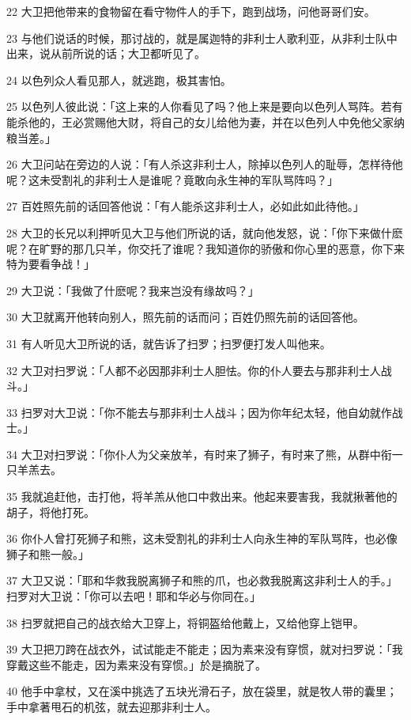 \par 22 大卫把他带来的食物留在看守物件人的手下，跑到战场，问他哥哥们安。
\par 23 与他们说话的时候，那讨战的，就是属迦特的非利士人歌利亚，从非利士队中出来，说从前所说的话；大卫都听见了。
\par 24 以色列众人看见那人，就逃跑，极其害怕。
\par 25 以色列人彼此说：「这上来的人你看见了吗？他上来是要向以色列人骂阵。若有能杀他的，王必赏赐他大财，将自己的女儿给他为妻，并在以色列人中免他父家纳粮当差。」
\par 26 大卫问站在旁边的人说：「有人杀这非利士人，除掉以色列人的耻辱，怎样待他呢？这未受割礼的非利士人是谁呢？竟敢向永生神的军队骂阵吗？」
\par 27 百姓照先前的话回答他说：「有人能杀这非利士人，必如此如此待他。」
\par 28 大卫的长兄以利押听见大卫与他们所说的话，就向他发怒，说：「你下来做什麽呢？在旷野的那几只羊，你交托了谁呢？我知道你的骄傲和你心里的恶意，你下来特为要看争战！」
\par 29 大卫说：「我做了什麽呢？我来岂没有缘故吗？」
\par 30 大卫就离开他转向别人，照先前的话而问；百姓仍照先前的话回答他。
\par 31 有人听见大卫所说的话，就告诉了扫罗；扫罗便打发人叫他来。
\par 32 大卫对扫罗说：「人都不必因那非利士人胆怯。你的仆人要去与那非利士人战斗。」
\par 33 扫罗对大卫说：「你不能去与那非利士人战斗；因为你年纪太轻，他自幼就作战士。」
\par 34 大卫对扫罗说：「你仆人为父亲放羊，有时来了狮子，有时来了熊，从群中衔一只羊羔去。
\par 35 我就追赶他，击打他，将羊羔从他口中救出来。他起来要害我，我就揪著他的胡子，将他打死。
\par 36 你仆人曾打死狮子和熊，这未受割礼的非利士人向永生神的军队骂阵，也必像狮子和熊一般。」
\par 37 大卫又说：「耶和华救我脱离狮子和熊的爪，也必救我脱离这非利士人的手。」扫罗对大卫说：「你可以去吧！耶和华必与你同在。」
\par 38 扫罗就把自己的战衣给大卫穿上，将铜盔给他戴上，又给他穿上铠甲。
\par 39 大卫把刀跨在战衣外，试试能走不能走；因为素来没有穿惯，就对扫罗说：「我穿戴这些不能走，因为素来没有穿惯。」於是摘脱了。
\par 40 他手中拿杖，又在溪中挑选了五块光滑石子，放在袋里，就是牧人带的囊里；手中拿著甩石的机弦，就去迎那非利士人。
